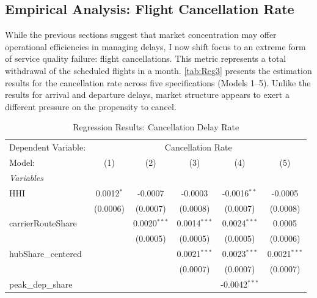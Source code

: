 \documentclass[preprint,12pt,authoryear]{elsarticle}
\begin{document}
\subsection{Empirical Analysis: Flight Cancellation Rate}

While the previous sections suggest that market concentration may offer operational efficiencies in managing delays, I now shift focus to an extreme form of service quality failure: flight cancellations. This metric represents a total withdrawal of the scheduled flights in a month. \autoref{tab:Reg3} presents the estimation results for the cancellation rate across five specifications (Models 1–5). Unlike the results for arrival and departure delays, market structure appears to exert a different pressure on the propensity to cancel.

\FloatBarrier
\begin{table}[htbp]
   \caption{\label{tab:Reg3} Regression Results: Cancellation Delay Rate}
   \centering
   \begin{tabular}{lccccc}
      \tabularnewline \midrule \midrule
      Dependent Variable: & \multicolumn{5}{c}{Cancellation Rate}\\
      Model:              & (1)                   & (2)                   & (3)                   & (4)             & (5)\\  
      \midrule
      \emph{Variables}\\
      HHI                 & 0.0012$^{*}$          & -0.0007               & -0.0003               & -0.0016$^{**}$  & -0.0005\\   
                          & (0.0006)              & (0.0007)              & (0.0008)              & (0.0007)        & (0.0008)\\   
      carrierRouteShare   &                       & 0.0020$^{***}$        & 0.0014$^{***}$        & 0.0024$^{***}$  & 0.0005\\   
                          &                       & (0.0005)              & (0.0005)              & (0.0005)        & (0.0006)\\   
      hubShare\_centered  &                       &                       & 0.0021$^{***}$        & 0.0023$^{***}$  & 0.0021$^{***}$\\   
                          &                       &                       & (0.0007)              & (0.0007)        & (0.0007)\\   
      peak\_dep\_share    &                       &                       &                       & -0.0042$^{***}$ &   \\   

\end{tabular}
\end{table}
\end{document}
